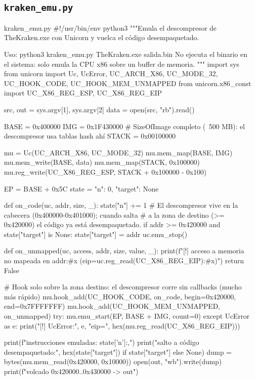 \documentclass[11pt,a4paper]{article}
\begin{document}
\subsection{\texttt{kraken\_emu.py}}
\begin{codigopython}{kraken\_emu.py}
#!/usr/bin/env python3
"""Emula el descompresor de TheKraken.exe con Unicorn y vuelca el código desempaquetado.

Uso: python3 kraken_emu.py TheKraken.exe salida.bin
No ejecuta el binario en el sistema: solo emula la CPU x86 sobre un buffer de memoria.
"""
import sys
from unicorn import Uc, UcError, UC_ARCH_X86, UC_MODE_32, UC_HOOK_CODE, UC_HOOK_MEM_UNMAPPED
from unicorn.x86_const import UC_X86_REG_ESP, UC_X86_REG_EIP

src, out = sys.argv[1], sys.argv[2]
data = open(src, "rb").read()

BASE = 0x400000
IMG = 0x1F430000          # SizeOfImage completo (~500 MB): el descompresor usa tablas hash ahí
STACK = 0x00100000

mu = Uc(UC_ARCH_X86, UC_MODE_32)
mu.mem_map(BASE, IMG)
mu.mem_write(BASE, data)
mu.mem_map(STACK, 0x100000)
mu.reg_write(UC_X86_REG_ESP, STACK + 0x100000 - 0x100)

EP = BASE + 0x5C
state = {"n": 0, "target": None}

def on_code(uc, addr, size, _):
    state["n"] += 1
    # El descompresor vive en la cabecera (0x400000-0x401000); cuando salta
    # a la zona de destino (>= 0x420000) el código ya está desempaquetado.
    if addr >= 0x420000 and state["target"] is None:
        state["target"] = addr
        uc.emu_stop()

def on_unmapped(uc, access, addr, size, value, _):
    print(f"[!] acceso a memoria no mapeada en {addr:#x} (eip={uc.reg_read(UC_X86_REG_EIP):#x})")
    return False

# Hook solo sobre la zona destino: el descompresor corre sin callbacks (mucho más rápido)
mu.hook_add(UC_HOOK_CODE, on_code, begin=0x420000, end=0x7FFFFFFF)
mu.hook_add(UC_HOOK_MEM_UNMAPPED, on_unmapped)
try:
    mu.emu_start(EP, BASE + IMG, count=0)
except UcError as e:
    print("[!] UcError:", e, "eip=", hex(mu.reg_read(UC_X86_REG_EIP)))

print(f"instrucciones emuladas: {state['n']:,}")
print("salto a código desempaquetado:", hex(state["target"]) if state["target"] else None)
dump = bytes(mu.mem_read(0x420000, 0x10000))
open(out, "wb").write(dump)
print(f"volcado 0x420000..0x430000 -> {out}")
\end{codigopython}
\end{document}
